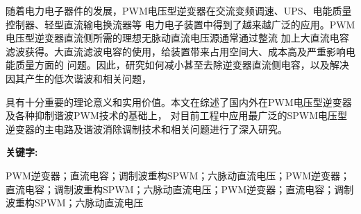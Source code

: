 
\begin{cnabstract}
     \thispagestyle{fancy}%
     随着电力电子器件的发展，PWM电压型逆变器在交流变频调速、UPS、电能质量控制器、轻型直流输电换流器等
     电力电子装置中得到了越来越广泛的应用。PWM电压型逆变器直流侧所需的理想无脉动直流电压源通常通过整流
     加上大直流电容滤波获得。大直流滤波电容的使用，给装置带来占用空间大、成本高及严重影响电能质量方面的
     问题。因此，研究如何减小甚至去除逆变器直流侧电容，以及解决因其产生的低次谐波和相关问题，

     具有十分重要的理论意义和实用价值。本文在综述了国内外在PWM电压型逆变器及各种抑制谐波PWM技术的基础上，
     对目前工程中应用最广泛的SPWM电压型逆变器的主电路及谐波消除调制技术和相关问题进行了深入研究。
    \par
    \vspace{1\baselineskip}
    \noindent\textbf{关键字: } \parbox[t]{30.8em}{PWM逆变器；直流电容；调制波重构SPWM；六脉动直流电压；PWM逆变器；直流电容；调制波重构SPWM；六脉动直流电压；PWM逆变器；直流电容；调制波重构SPWM；六脉动直流电压 }
\end{cnabstract}
    
\newpage
        
